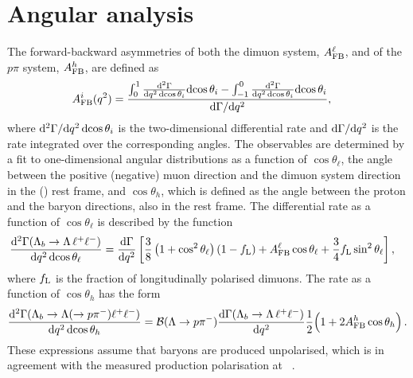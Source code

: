 \section{Angular analysis}
The forward-backward asymmetries of both the dimuon system, $A_{\rm
  FB}^\ell$, and of the $p\pi$ system, $A_{\rm FB}^h$, are defined as
\begin{align}
A_{\rm FB}^i({q^2})&=\frac{\int_0^1 \frac{\mathrm{d}^2\Gamma}{\mathrm{d}{q^2}\,\mathrm{d}\!\cos\theta_i} \mathrm{d}\!\cos\theta_i-
               \int^0_{-1} \frac{\mathrm{d}^2\Gamma}{\mathrm{d}{q^2}\,\mathrm{d}\!\cos\theta_i} \mathrm{d}\!\cos\theta_i}{\mathrm{d}\Gamma / \mathrm{d} {q^2}},
\label{eq:afbTh}
\end{align}
\noindent
where $\mathrm{d}^2\Gamma/\mathrm{d} q^2\,\mathrm{d}\!\cos\theta_i$ is the
two-dimensional differential rate and $\mathrm{d}\Gamma/\mathrm{d} q^2$ is the
rate integrated over the corresponding angles.  The observables are
determined by a fit to one-dimensional angular distributions as a
function of $\cos \theta_\ell$, the angle between the positive
(negative) muon direction and the dimuon system direction in the
\Lb(\Lbbar) rest frame, and $\cos \theta_h$, which is defined as the
angle between the proton and the \Lz baryon directions, also in the
\Lb rest frame. The differential rate as a function of $\cos
\theta_\ell$ is described by the function
\begin{align}
\frac{\mathrm{d}^2\Gamma(\Lambda_{b}\rightarrow \Lambda \,\ell^{+}\ell^{-})}{\mathrm{d}{q^2}\,\mathrm{d}\!\cos\theta_\ell}=
\frac{\mathrm{d}\Gamma}{\mathrm{d}{q^2}}&\left[  \frac{3}{8}\left(1+\cos^2\theta_\ell\right)(1-f_{\rm L})+A_{\rm FB}^\ell\cos\theta_\ell +
   \frac{3}{4}f_{\rm L} \sin^2\theta_\ell \right], 
\label{eq:afbLTh}
\end{align}
where $f_{\rm L}$ is the fraction of longitudinally polarised dimuons.
 The rate as a function of $\cos \theta_h$ has the form
\begin{equation}
\frac{\mathrm{d}^2\Gamma(\Lambda_{b}\rightarrow \Lambda(\rightarrow p \pi^{-})\ell^{+}\ell^{-})}
     {\mathrm{d}{q^2}\,\mathrm{d}\!\cos\theta_h} 
={{\cal B}}(\Lambda \rightarrow p\pi^{-})
 \frac{\mathrm{d}\Gamma(\Lambda_b \rightarrow \Lambda\, \ell^{+}\ell^{-})}{\mathrm{d} {q^2}}\frac{1}{2}
\Big(1+2A_{\rm FB}^h\cos\theta_h\Big) \,.
\label{eq:afbBTh}
\end{equation}
\noindent
These expressions assume that \Lb baryons are produced unpolarised,
which is in agreement with the measured production polarisation at
\lhcb~\cite{LHCb-PAPER-2012-057}.

